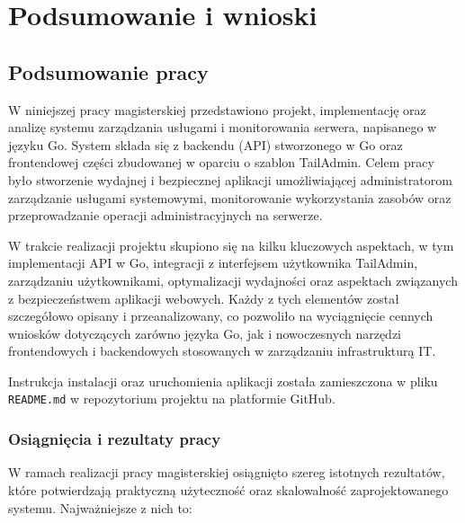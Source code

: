 \chapter{Podsumowanie i wnioski}

\section{Podsumowanie pracy}

W niniejszej pracy magisterskiej przedstawiono projekt, implementację oraz analizę systemu zarządzania usługami i monitorowania serwera, napisanego w języku Go. System składa się z backendu (API) stworzonego w Go oraz frontendowej części zbudowanej w oparciu o szablon TailAdmin. Celem pracy było stworzenie wydajnej i bezpiecznej aplikacji umożliwiającej administratorom zarządzanie usługami systemowymi, monitorowanie wykorzystania zasobów oraz przeprowadzanie operacji administracyjnych na serwerze.

W trakcie realizacji projektu skupiono się na kilku kluczowych aspektach, w tym implementacji API w Go, integracji z interfejsem użytkownika TailAdmin, zarządzaniu użytkownikami, optymalizacji wydajności oraz aspektach związanych z bezpieczeństwem aplikacji webowych. Każdy z tych elementów został szczegółowo opisany i przeanalizowany, co pozwoliło na wyciągnięcie cennych wniosków dotyczących zarówno języka Go, jak i nowoczesnych narzędzi frontendowych i backendowych stosowanych w zarządzaniu infrastrukturą IT.

Instrukcja instalacji oraz uruchomienia aplikacji została zamieszczona w pliku \texttt{README.md} w repozytorium projektu na platformie GitHub\cite{NestOpsV2}.


\subsection{Osiągnięcia i rezultaty pracy}

W ramach realizacji pracy magisterskiej osiągnięto szereg istotnych rezultatów, które potwierdzają praktyczną użyteczność oraz skalowalność zaprojektowanego systemu. Najważniejsze z nich to:

